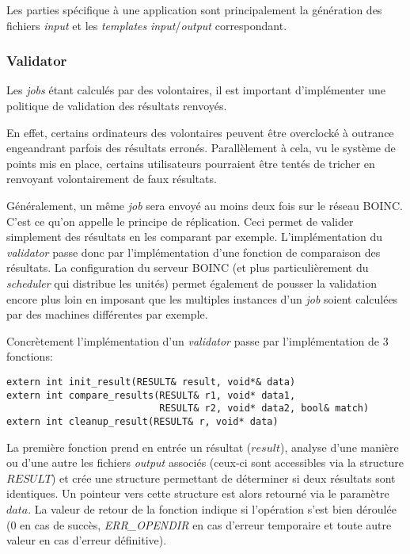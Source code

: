 \documentclass[a4paper, 11pt]{article}
\begin{document}
Les parties spécifique à une application sont principalement la génération des fichiers \textit{input} et les \textit{templates} \textit{input}/\textit{output} correspondant.

\subsubsection{Validator}
Les \textit{jobs} étant calculés par des volontaires, il est important d'implémenter une politique de validation des résultats renvoyés. 

En effet, certains ordinateurs des volontaires peuvent être overclocké à outrance engeandrant parfois des résultats erronés. Parallèlement à cela, vu le système de points mis en place, certains utilisateurs pourraient être tentés de tricher en renvoyant volontairement de faux résultats. 

Généralement, un même \textit{job} sera envoyé au moins deux fois sur le réseau \textsc{BOINC}. C'est ce qu'on appelle le principe de réplication. Ceci permet de valider simplement des résultats en les comparant par exemple. L'implémentation du \textit{validator} passe donc par l'implémentation d'une fonction de comparaison des résultats. La configuration du serveur \textsc{BOINC} (et plus particulièrement du \textit{scheduler} qui distribue les unités) permet également de pousser la validation encore plus loin en imposant que les multiples instances d'un \textit{job} soient calculées par des machines différentes par exemple.

Concrètement l'implémentation d'un \textit{validator} passe par l'implémentation de 3 fonctions:
\begin{verbatim}
extern int init_result(RESULT& result, void*& data)
extern int compare_results(RESULT& r1, void* data1, 
                           RESULT& r2, void* data2, bool& match)
extern int cleanup_result(RESULT& r, void* data)
\end{verbatim}

La première fonction prend en entrée un résultat ($result$), analyse d'une manière ou d'une autre les fichiers \textit{output} associés (ceux-ci sont accessibles via la structure $RESULT$) et crée une structure permettant de déterminer si deux résultats sont identiques. Un pointeur vers cette structure est alors retourné via le paramètre $data$. La valeur de retour de la fonction indique si l'opération s'est bien déroulée (0 en cas de succès, \textit{ERR\_OPENDIR} en cas d'erreur temporaire et toute autre valeur en cas d'erreur définitive).
\end{document}
